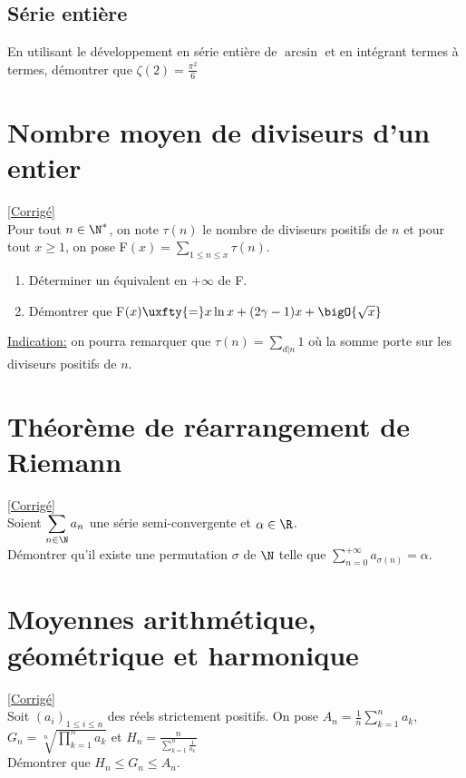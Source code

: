 \documentclass{book}
\begin{document}
	\subsection{Série entière }
	En utilisant le développement en série entière de $\arcsin$ et en intégrant termes à termes, démontrer que $\zeta(2)=\displaystyle\frac{\pi^2}{6}$
	
	\section{Nombre moyen de diviseurs d'un entier }
	\label{Nombre moyen de diviseurs d'un entier}
	\textcolor{blue}{\hyperref[sec:nombre-moyen-de-diviseurs-dun-entier-etoile4]{[Corrigé]}}\\
	Pour tout $n \in \N^*$, on note $\tau(n)$ le nombre de diviseurs positifs de $n$ et pour tout $x \geq 1$, on pose F$(x)=\displaystyle\sum\limits_{1\leq n \leq x} \tau(n)$.
	\begin{enumerate}
		\item Déterminer un équivalent en $+\infty$ de F.
		\item Démontrer que F$(x)\uxfty{=}x\ln x+(2\gamma-1)x+\bigO{\sqrt x}$
	\end{enumerate}
	\underline{Indication:} on pourra remarquer que $\tau(n)=\displaystyle\sum\limits_{d|n}1$ où la somme porte sur les diviseurs positifs de $n$.
	
	\section{Théorème de réarrangement de Riemann }
	\label{Théorème de réarrangement de Riemann}
	\textcolor{blue}{\hyperref[sec:theoreme-de-rearrangement-de-riemann-etoile5]{[Corrigé]}}\\
	Soient $\displaystyle\sum\limits_{n\in \N} a_n$ une série semi-convergente et $\alpha \in \R$.
	\\Démontrer qu'il existe une permutation $\sigma$ de $\N$ telle que $\displaystyle\sum\limits_{n=0}^{+\infty}a_{\sigma(n)}=\alpha$.
	
	\section{Moyennes arithmétique, géométrique et harmonique }
	\label{Moyennes arithémtique, géométrique et harmonique}
	\textcolor{blue}{\hyperref[sec:moyennes-arithmetique-geometrique-et-harmonique-etoile1]{[Corrigé]}}\\
	Soit $(a_i)_{1\leq i\leq n}$ des réels strictement positifs. On pose $A_n=\displaystyle\frac{1}{n}\sum\limits_{k=1}^n a_k$, $G_n=\displaystyle\sqrt[n]{\prod\limits_{k=1}^n a_k}$ et $H_n=\displaystyle\frac{n}{\displaystyle\sum\limits_{k=1}^n \frac{1}{a_k}}$\\
	Démontrer que $H_n \leq G_n \leq A_n$.
	
\end{document}
